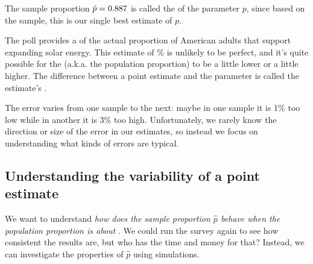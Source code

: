 
The sample proportion $\hat{p} = 0.887{}$ is called
the  of the parameter $p$, since based
on the sample, this is our single best estimate of $p$.

The poll provides a  of the actual proportion
of American adults that support expanding solar energy.
This estimate of \pewsolarpollpercent{}\% is unlikely to be perfect,
and it's quite possible for the 
(a.k.a. the population proportion) to be a little lower
or a little higher. The difference between a point estimate
and the parameter is called the estimate's .


The error varies from one sample to the next: maybe
in one sample it is 1\% too low while in another
it is 3\% too high. Unfortunately, we rarely know the direction
or size of the error in our estimates, so instead we focus
on understanding what kinds of errors are typical.


\subsection{Understanding the variability of a point estimate}
\label{simulationForUnderstandingVariabilitySection}

We want to understand \emph{how does the
sample proportion $\hat{p}$ behave when the population
proportion is about \pewsolarpollprop{}}. We could
run the survey again to see how consistent the results
are, but who has the time and money for that? Instead,
we can investigate the properties of $\hat{p}$ using simulations.

